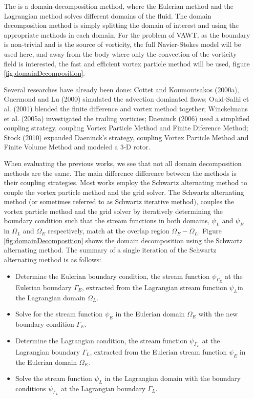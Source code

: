 The  is a domain-decomposition method, where the Eulerian method and the Lagrangian method solves different domains of the fluid. The domain decomposition method is simply splitting the domain of interest and using the appropriate methods in each domain. For the problem of VAWT, as the boundary is non-trivial and is the source of vorticity, the full Navier-Stokes model will be used here, and away from the body where only the convection of the vorticity field is interested, the fast and efficient vortex particle method will be used, figure \ref{fig:domainDecomposition}.

Several researches have already been done: Cottet and Koumoutsakos (2000a)\cite{Cottet2000a}, Guermond and Lu (2000) \cite{Guermond2000} simulated the advection dominated flows; Ould-Salhi et al. (2001) \cite{Ould-Salihi2001} blended the finite difference and vortex method together; Winckelmans et al. (2005a) \cite{Winckelmans2005a} investigated the trailing vorticies; Daeninck (2006) \cite{Daeninck2006} used a simplified coupling strategy, coupling Vortex Particle Method and Finite Diference Method; Stock (2010) \cite{Stock} expanded Daeninck's strategy, coupling Vortex Particle Method and Finite Volume Method and modeled a 3-D rotor.

When evaluating the previous works, we see that not all domain decomposition methods are the same. The main difference difference between the methods is their coupling strategies. Most works employ the Schwartz alternating method to couple the vortex particle method and the grid solver. The Schwartz alternating method (or sometimes referred to as Schwartz iterative method), couples the vortex particle method and the grid solver by iteratively determining the boundary condition such that the stream functions in both domains, $\psi_L$ and $\psi_E$ in $\Omega_L$ and $\Omega_E$ respectively, match at the overlap region $\Omega_E-\Omega_L$. Figure \ref{fig:domainDecomposition} shows the domain decomposition using the Schwartz alternating method. The summary of a single iteration of the Schwartz alternating method is as follows:
	\begin{itemize}
	\item Determine the Eulerian boundary condition, the stream function $\psi_{\Gamma_E}$ at the Eulerian boundary $\Gamma_E$, extracted from the Lagrangian stream function $\psi_L$in the Lagrangian domain $\Omega_L$.
	\item Solve for the stream function $\psi_E$ in the Eulerian domain $\Omega_E$ with the new boundary condition $\Gamma_E$.
	\item Determine the Lagrangian condition, the stream function $\psi_{\Gamma_L}$ at the Lagrangian boundary $\Gamma_L$, extracted from the Eulerian stream function $\psi_E$ in the Eulerian domain $\Omega_E$.
	\item Solve the stream function $\psi_L$ in the Lagrangian domain with the boundary conditions $\psi_{\Gamma_L}$ at the Lagrangian boundary $\Gamma_L$.
	\end{itemize}
	
